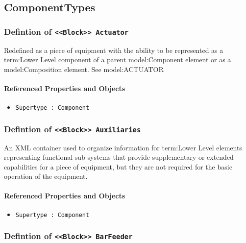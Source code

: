 \subsection{ComponentTypes} \label{model:ComponentTypes}
\subsubsection{Defintion of \texttt{<<Block>> Actuator}}
  \label{type:Actuator}

\FloatBarrier

Redefined as a piece of equipment with the ability to be represented as a {term:Lower Level} component of a parent {model:Component} element or as a {model:Composition} element. See {model:ACTUATOR}

\FloatBarrier
\paragraph{Referenced Properties and Objects}

\begin{itemize}
\item \texttt{Supertype : Component}

\end{itemize}
\FloatBarrier
\subsubsection{Defintion of \texttt{<<Block>> Auxiliaries}}
  \label{type:Auxiliaries}

\FloatBarrier

An XML container used to organize information for {term:Lower Level} elements representing functional sub-systems that provide supplementary or extended capabilities for a piece of equipment, but they are not required for the basic operation of the equipment.

\FloatBarrier
\paragraph{Referenced Properties and Objects}

\begin{itemize}
\item \texttt{Supertype : Component}

\end{itemize}
\FloatBarrier
\subsubsection{Defintion of \texttt{<<Block>> BarFeeder}}
  \label{type:BarFeeder}

